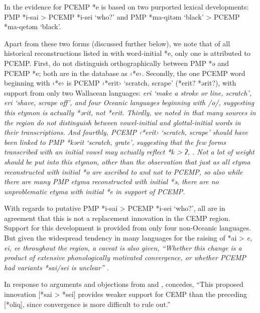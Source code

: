 In \citet[247--249]{Blust1993} the evidence for PCEMP *e is based on
two purported lexical developments: PMP *i-sai > PCEMP *i-sei
‘who?’ and PMP *ma-qitəm ‘black’ > PCEMP *ma-qetəm ‘black’.

Apart from these two forms (discussed further below),
we note that of all historical reconstructions listed in \citet{BlustTrussel2020}
with word-initial *e,
only one is attributed to PCEMP.
First, \citet{BlustTrussel2020} do not distinguish orthographically
between PMP *ə and PCEMP *e; both are in the database as ‹*e›.
Secondly, the one PCEMP word beginning with ‹*e› is PCEMP ‹*erit›
‘scratch, scrape’ (*erit? *ərit?), with support from only two Wallacean
languages:  \it{eri} ‘make a stroke or line,
scratch’,  \it{eri} ‘shave, scrape off’,
and four Oceanic languages beginning with /o/,
suggesting this etymon is actually *ərit, not *erit.
Thirdly, we noted in  that many sources in the
region do not distinguish between vowel-initial
and glottal-initial words in their transcriptions.
And fourthly, PCEMP ‹*erit› ‘scratch, scrape’ should have been
linked to PMP *kərit ‘scratch,
grate’, suggesting that the few forms transcribed with an initial
vowel may actually reflect *k > \it{ʔ}, {\0}.
Not a lot of weight should be put into this etymon,
other than the observation that just as all etyma reconstructed
with initial *o are ascribed to 
and not to PCEMP,
so also while there are many PMP etyma reconstructed with initial
*ə, there are no unproblematic etyma with initial *e in support of PCEMP.

With regards to putative PMP *i-sai > PCEMP *i-sei ‘who?’,
all are in agreement that this is not a replacement innovation
in the CEMP region.
Support for this development is provided from only four non-Oceanic languages.
But given the widespread tendency in many languages for the raising
of *ai > \it{e,
ei, ee} throughout the region,
a caveat is also given,
“Whether this change is a product of extensive phonologically
motivated convergence, or whether PCEMP had variants
*sai/sei is unclear” \citep[247f]{Blust1993}.

In response to arguments
and objections from \citet{Nothofer1992}
and \citet{DonohueGrimes2008}, \citet[54]{Blust2009} concedes,
“This proposed innovation [*sai > *sei] provides weaker support
for CEMP than the preceding [*oliq],
since convergence is more difficult to rule out.”

